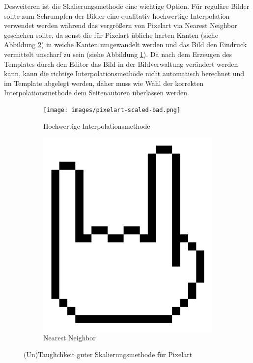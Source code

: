 Desweiteren ist die Skalierungsmethode eine wichtige Option. Für reguläre Bilder
sollte zum Schrumpfen der Bilder eine qualitativ hochwertige Interpolation
verwendet werden während das vergrößern von Pixelart via Nearest Neighbor
geschehen sollte, da sonst die für Pixelart übliche harten Kanten (siehe
Abbildung \ref{fig:pixelart-scaled-good}) in weiche Kanten umgewandelt werden
und das Bild den Eindruck vermittelt unscharf zu sein (siehe Abbildung
\ref{fig:pixelart-scaled-bad}). Da nach dem Erzeugen des Templates durch den
Editor das Bild in der Bildverwaltung verändert werden kann, kann die richtige
Interpolationsmethode nicht automatisch berechnet und im Template abgelegt
werden, daher muss wie Wahl der korrekten Interpolationsmethode dem
Seitenautoren überlassen werden.

\begin{figure}
  \begin{subfigure}[b]{\columnwidth/2}
    \texttt{[image: images/pixelart-scaled-bad.png]}
    \caption{Hochwertige Interpolationsmethode}
    \label{fig:pixelart-scaled-bad}
  \end{subfigure}
  \begin{subfigure}[b]{\columnwidth/2}
    \includegraphics[width=\columnwidth]{images/pixelart-scaled-good.png}
    \caption{Nearest Neighbor}
    \label{fig:pixelart-scaled-good}
  \end{subfigure}
  \caption{(Un)Tauglichkeit guter Skalierungsmethode für Pixelart}
  \label{fig:pixelart-scaling-overview}
\end{figure}

